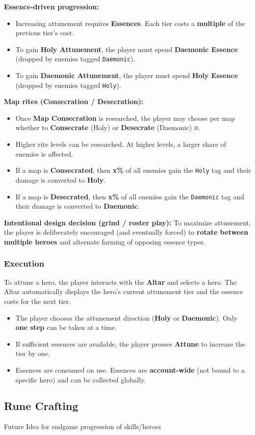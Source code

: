 \noindent
\textbf{Essence-driven progression:}
\begin{itemize}
	\item Increasing attunement requires \textbf{Essences}. Each tier costs a \textbf{multiple} of the previous tier's cost.
	\item To gain \textbf{Holy Attunement}, the player must spend \textbf{Daemonic Essence} (dropped by enemies tagged \texttt{Daemonic}).
	\item To gain \textbf{Daemonic Attunement}, the player must spend \textbf{Holy Essence} (dropped by enemies tagged \texttt{Holy}).
\end{itemize}

\noindent
\textbf{Map rites (Consecration / Desecration):}
\begin{itemize}
	\item Once \textbf{Map Consecration} is researched, the player may choose per map whether to \textbf{Consecrate} (Holy) or \textbf{Desecrate} (Daemonic) it.
	\item Higher rite levels can be researched. At higher levels, a larger share of enemies is affected.
	\item If a map is \textbf{Consecrated}, then \textbf{x\%} of all enemies gain the \texttt{Holy} tag and their damage is converted to \textbf{Holy}.
	\item If a map is \textbf{Desecrated}, then \textbf{x\%} of all enemies gain the \texttt{Daemonic} tag and their damage is converted to \textbf{Daemonic}.
\end{itemize}

\noindent
\textbf{Intentional design decision (grind / roster play):}
To maximize attunement, the player is deliberately encouraged (and eventually forced) to \textbf{rotate between multiple heroes} and alternate farming of opposing essence types.

\subsubsection*{Execution}

To attune a hero, the player interacts with the \textbf{Altar} and selects a hero.
The Altar automatically displays the hero's current attunement tier and the essence costs for the next tier.

\begin{itemize}
	\item The player chooses the attunement direction (\textbf{Holy} or \textbf{Daemonic}). Only \textbf{one step} can be taken at a time.
	\item If sufficient essences are available, the player presses \textbf{Attune} to increase the tier by one.
	\item Essences are consumed on use. Essences are \textbf{account-wide} (not bound to a specific hero) and can be collected globally.
\end{itemize}


\subsection{Rune Crafting}
Future Idea for endgame progression of skills/heroes
